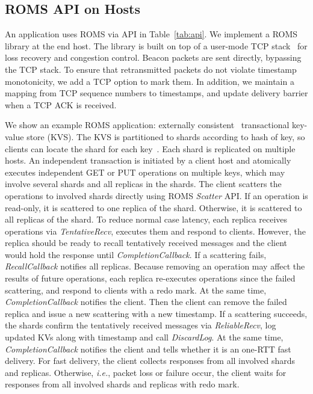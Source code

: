 
\iffalse
\subsection{ROMS API on Hosts}
\label{sec:api}

An application uses ROMS via API in Table~\ref{tab:api}.
We implement a ROMS library at the end host. The library is built on top of a user-mode TCP stack~\cite{libvma,dunkels2001design} for loss recovery and congestion control. Beacon packets are sent directly, bypassing the TCP stack. To ensure that retransmitted packets do not violate timestamp monotonicity, we add a TCP option to mark them. In addition, we maintain a mapping from TCP sequence numbers to timestamps, and update delivery barrier when a TCP ACK is received.

We show an example ROMS application: externally consistent~\cite{corbett2013spanner} transactional key-value store (KVS).
The KVS is partitioned to shards according to hash of key, so clients can locate the shard for each key~\cite{nishtala2013scaling,eris}.
Each shard is replicated on multiple hosts.
An independent transaction is initiated by a client host and atomically executes independent GET or PUT operations on multiple keys, which may involve several shards and all replicas in the shards.
The client scatters the operations to involved shards directly using ROMS \emph{Scatter} API.
If an operation is read-only, it is scattered to one replica of the shard. Otherwise, it is scattered to all replicas of the shard.
To reduce normal case latency, each replica receives operations via \emph{TentativeRecv}, executes them and respond to clients.
However, the replica should be ready to recall tentatively received messages and the client would hold the response until \emph{CompletionCallback}.
If a scattering fails, \emph{RecallCallback} notifies all replicas.
Because removing an operation may affect the results of future operations, each replica re-executes operations since the failed scattering, and respond to clients with a redo mark.
At the same time, \emph{CompletionCallback} notifies the client. Then the client can remove the failed replica and issue a new scattering with a new timestamp.
If a scattering succeeds, the shards confirm the tentatively received messages via \emph{ReliableRecv}, log updated KVs along with timestamp and call \emph{DiscardLog}.
At the same time, \emph{CompletionCallback} notifies the client and tells whether it is an one-RTT fast delivery.
For fast delivery, the client collects responses from all involved shards and replicas.
Otherwise, \emph{i.e.}, packet loss or failure occur, the client waits for responses from all involved shards and replicas with redo mark.

